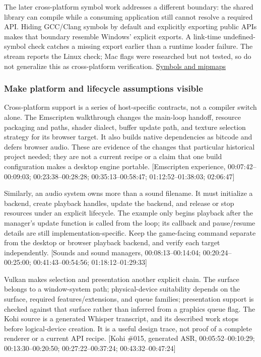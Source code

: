 The later cross-platform symbol work addresses a different boundary: the shared library can compile while a consuming application still cannot resolve a required API. Hiding GCC/Clang symbols by default and explicitly exporting public APIs makes that boundary resemble Windows' explicit exports. A link-time undefined-symbol check catches a missing export earlier than a runtime loader failure. The stream reports the Linux check; Mac flags were researched but not tested, so do not generalize this as cross-platform verification. \href{https://www.youtube.com/watch?v=xb23Y9o7tP4}{Symbols and mipmaps}

\subsubsection{Make platform and lifecycle assumptions visible}\label{05-engine-i-ch013-make-platform-and-lifecycle-assumptions-visible}

\hypertarget{05-engine-i-ch013-make-platform-and-lifecycle-assumptions-visible}{}

Cross-platform support is a series of host-specific contracts, not a compiler switch alone. The Emscripten walkthrough changes the main-loop handoff, resource packaging and paths, shader dialect, buffer update path, and texture selection strategy for its browser target. It also builds native dependencies as bitcode and defers browser audio. These are evidence of the changes that particular historical project needed; they are not a current recipe or a claim that one build configuration makes a desktop engine portable. {[}Emscripten experience, 00:07:42--00:09:03; 00:23:38--00:28:28; 00:35:13--00:58:47; 01:12:52--01:38:03; 02:06:47{]}

Similarly, an audio system owns more than a sound filename. It must initialize a backend, create playback handles, update the backend, and release or stop resources under an explicit lifecycle. The example only begins playback after the manager's update function is called from the loop; its callback and pause/resume details are still implementation-specific. Keep the game-facing command separate from the desktop or browser playback backend, and verify each target independently. {[}Sounds and sound managers, 00:08:13--00:14:04; 00:20:24--00:25:00; 00:41:43--00:54:56; 01:18:12--01:29:33{]}

Vulkan makes selection and presentation another explicit chain. The surface belongs to a window-system path; physical-device suitability depends on the surface, required features/extensions, and queue families; presentation support is checked against that surface rather than inferred from a graphics queue flag. The Kohi source is a generated Whisper transcript, and its described work stops before logical-device creation. It is a useful design trace, not proof of a complete renderer or a current API recipe. {[}Kohi \#015, generated ASR, 00:05:52--00:10:29; 00:13:30--00:20:50; 00:27:22--00:37:24; 00:43:32--00:47:24{]}

